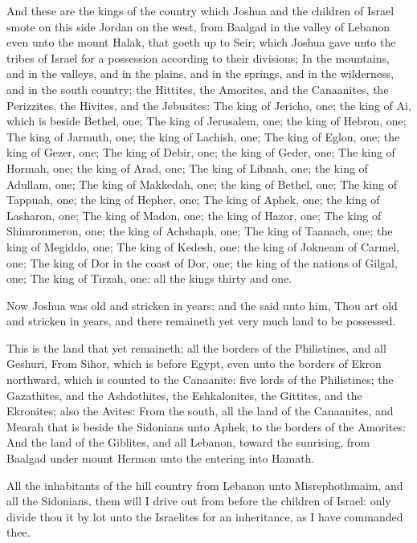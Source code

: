 \Verse And these are the kings of the country which Joshua and the children of Israel smote on this side Jordan on the west, from Baalgad in the valley of Lebanon even unto the mount Halak, that goeth up to Seir; which Joshua gave unto the tribes of Israel for a possession according to their divisions; \Verse In the mountains, and in the valleys, and in the plains, and in the springs, and in the wilderness, and in the south country; the Hittites, the Amorites, and the Canaanites, the Perizzites, the Hivites, and the Jebusites: \Verse The king of Jericho, one; the king of Ai, which is beside Bethel, one; \Verse The king of Jerusalem, one; the king of Hebron, one; \Verse The king of Jarmuth, one; the king of Lachish, one; \Verse The king of Eglon, one; the king of Gezer, one; \Verse The king of Debir, one; the king of Geder, one; \Verse The king of Hormah, one; the king of Arad, one; \Verse The king of Libnah, one; the king of Adullam, one; \Verse The king of Makkedah, one; the king of Bethel, one; \Verse The king of Tappuah, one; the king of Hepher, one; \Verse The king of Aphek, one; the king of Lasharon, one; \Verse The king of Madon, one; the king of Hazor, one; \Verse The king of Shimronmeron, one; the king of Achshaph, one; \Verse The king of Taanach, one; the king of Megiddo, one; \Verse The king of Kedesh, one; the king of Jokneam of Carmel, one; \Verse The king of Dor in the coast of Dor, one; the king of the nations of Gilgal, one; \Verse The king of Tirzah, one: all the kings thirty and one.


\Chapter
\Verse Now Joshua was old and stricken in years; and the \LORD said unto him, Thou art old and stricken in years, and there remaineth yet very much land to be possessed.

\Verse This is the land that yet remaineth: all the borders of the Philistines, and all Geshuri, \Verse From Sihor, which is before Egypt, even unto the borders of Ekron northward, which is counted to the Canaanite: five lords of the Philistines; the Gazathites, and the Ashdothites, the Eshkalonites, the Gittites, and the Ekronites; also the Avites: \Verse From the south, all the land of the Canaanites, and Mearah that is beside the Sidonians unto Aphek, to the borders of the Amorites: \Verse And the land of the Giblites, and all Lebanon, toward the sunrising, from Baalgad under mount Hermon unto the entering into Hamath.

\Verse All the inhabitants of the hill country from Lebanon unto Misrephothmaim, and all the Sidonians, them will I drive out from before the children of Israel: only divide thou it by lot unto the Israelites for an inheritance, as I have commanded thee.

